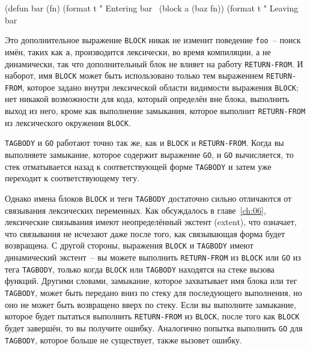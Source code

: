 \begin{myverb}
(defun bar (fn)
  (format t "  Entering bar~%
  (block a (baz fn))
  (format t "  Leaving bar~%
\end{myverb}

Это дополнительное выражение \lstinline{BLOCK} никак не изменит поведение \lstinline{foo}~-- поиск
имён, таких как \lstinline{a}, производится лексически, во время компиляции, а не динамически,
так что дополнительный блок не влияет на работу \lstinline{RETURN-FROM}. И наборот, имя
\lstinline{BLOCK} может быть использовано только тем выражением \lstinline{RETURN-FROM}, которое
задано внутри лексической области видимости выражения \lstinline{BLOCK}; нет никакой
возможности для кода, который определён вне блока, выполнить выход из него, кроме как
выполнение замыкания, которое выполнит \lstinline{RETURN-FROM} из лексического окружения
\lstinline{BLOCK}.

\lstinline{TAGBODY} и \lstinline{GO} работают точно так же, как и \lstinline{BLOCK} и \lstinline{RETURN-FROM}.
Когда вы выполняете замыкание, которое содержит выражение \lstinline{GO}, и \lstinline{GO}
вычисляется, то стек отматывается назад к соответствующей форме \lstinline{TAGBODY} и затем
уже переходит к соответствующему тегу.

Однако имена блоков \lstinline{BLOCK} и теги \lstinline{TAGBODY} достаточно сильно отличаются от
связывания лексических переменных. Как обсуждалось в главе~\ref{ch:06}, лексические
связывания имеют неопределённый экстент (extent), что означает, что связывания не
исчезают даже после того, как связывающая форма будет возвращена. С другой стороны,
выражения \lstinline{BLOCK} и \lstinline{TAGBODY} имеют динамический экстент~-- вы можете выполнить
\lstinline{RETURN-FROM} из \lstinline{BLOCK} или \lstinline{GO} из тега \lstinline{TAGBODY}, только когда
\lstinline{BLOCK} или \lstinline{TAGBODY} находятся на стеке вызова функций. Другими словами,
замыкание, которое захватывает имя блока или тег \lstinline{TAGBODY}, может быть передано вниз
по стеку для последующего выполнения, но оно не может быть возвращено вверх по
стеку. Если вы выполните замыкание, которое будет пытаться выполнить \lstinline{RETURN-FROM} из
\lstinline{BLOCK}, после того как \lstinline{BLOCK} будет завершён, то вы получите
ошибку. Аналогично попытка выполнить \lstinline{GO} для \lstinline{TAGBODY}, которое больше не
существует, также вызовет ошибку.

